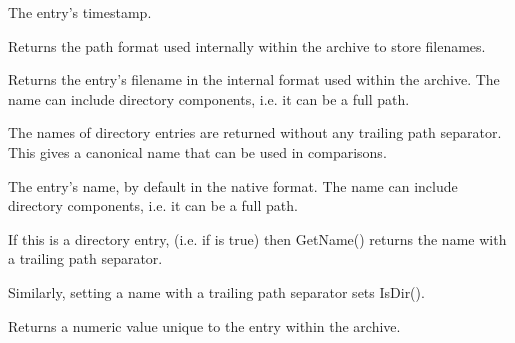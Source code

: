 

The entry's timestamp.


\label{wxarchiveentrygetinternalformat}


Returns the path format used internally within the archive to store
filenames.


\label{wxarchiveentrygetinternalname}


Returns the entry's filename in the internal format used within the
archive. The name can include directory components, i.e. it can be a
full path.

The names of directory entries are returned without any trailing path
separator. This gives a canonical name that can be used in comparisons.




\label{wxarchiveentryname}



The entry's name, by default in the native format. The name can include
directory components, i.e. it can be a full path.

If this is a directory entry, (i.e. if 
is true) then GetName() returns the name with a trailing path separator.

Similarly, setting a name with a trailing path separator sets IsDir().


\label{wxarchiveentrygetoffset}


Returns a numeric value unique to the entry within the archive.


\label{wxarchiveentrysize}


